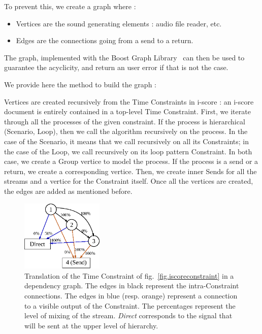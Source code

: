 \documentclass{article}
\begin{document}
To prevent this, we create a graph where : 
\begin{itemize}
	\item Vertices are the sound generating elements : audio file reader, etc.
	\item Edges are the connections going from a send to a return.
\end{itemize} 

The graph, implemented with the Boost Graph Library~\cite{siek2001boost} can then be used to 
guarantee the acyclicity, and return an user error if that is not the case.

We provide here the method to build the graph :

Vertices are created recursively from the Time Constraints in i-score : an i-score document is entirely contained in a top-level Time Constraint.
First, we iterate through all the processes of the given constraint.
If the process is hierarchical (Scenario, Loop), then we call the algorithm recursively on the process.
In the case of the Scenario, it means that we call recursively on all its Constraints; in the case of the Loop, we call recursively on its loop pattern Constraint.
In both case, we create a Group vertice to model the process.
If the process is a send or a return, we create a corresponding vertice.
Then, we create inner Sends for all the streams and a vertice for the Constraint itself.
Once all the vertices are created, the edges are added as mentioned before.

\begin{figure}
	\centering
	\includegraphics[width=0.35\textwidth]{figures/graph1.eps}
	\caption{Translation of the Time Constraint of fig.~\ref{fig.iscoreconstraint} in a dependency graph.
		The edges in black represent the intra-Constraint connections. 
		The edges in blue (resp. orange) represent a connection to a visible output of 
		the Constraint. The percentages represent the level of mixing of the stream.
		\textit{Direct} corresponds to the signal that will be sent at the upper level of hierarchy.}
	\label{fig.graph}
\end{figure}
\end{document}
